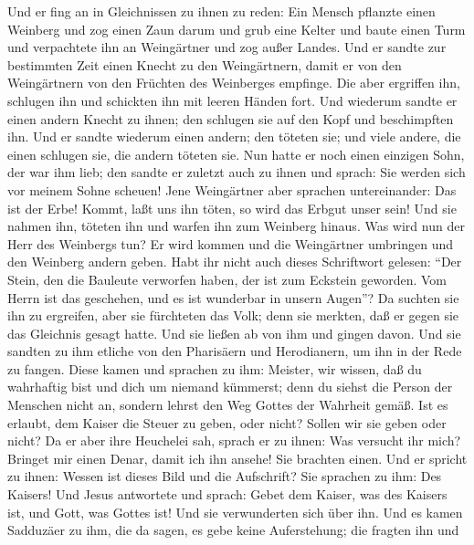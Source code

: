  Und er fing an in Gleichnissen zu ihnen zu reden: Ein
Mensch pflanzte einen Weinberg und zog einen Zaun darum und grub eine
Kelter und baute einen Turm und verpachtete ihn an Weingärtner und zog
außer Landes.  Und er sandte zur bestimmten Zeit einen
Knecht zu den Weingärtnern, damit er von den Weingärtnern von den
Früchten des Weinberges empfinge.  Die aber ergriffen ihn,
schlugen ihn und schickten ihn mit leeren Händen fort. 
Und wiederum sandte er einen andern Knecht zu ihnen; den schlugen sie
auf den Kopf und beschimpften ihn.  Und er sandte wiederum
einen andern; den töteten sie; und viele andere, die einen schlugen sie,
die andern töteten sie.  Nun hatte er noch einen einzigen
Sohn, der war ihm lieb; den sandte er zuletzt auch zu ihnen und sprach:
Sie werden sich vor meinem Sohne scheuen!  Jene
Weingärtner aber sprachen untereinander: Das ist der Erbe! Kommt, laßt
uns ihn töten, so wird das Erbgut unser sein!  Und sie
nahmen ihn, töteten ihn und warfen ihn zum Weinberg hinaus.
 Was wird nun der Herr des Weinbergs tun? Er wird kommen
und die Weingärtner umbringen und den Weinberg andern geben.
 Habt ihr nicht auch dieses Schriftwort gelesen: ``Der
Stein, den die Bauleute verworfen haben, der ist zum Eckstein geworden.
 Vom Herrn ist das geschehen, und es ist wunderbar in
unsern Augen''?  Da suchten sie ihn zu ergreifen, aber
sie fürchteten das Volk; denn sie merkten, daß er gegen sie das
Gleichnis gesagt hatte. Und sie ließen ab von ihm und gingen davon.
 Und sie sandten zu ihm etliche von den Pharisäern und
Herodianern, um ihn in der Rede zu fangen.  Diese kamen
und sprachen zu ihm: Meister, wir wissen, daß du wahrhaftig bist und
dich um niemand kümmerst; denn du siehst die Person der Menschen nicht
an, sondern lehrst den Weg Gottes der Wahrheit gemäß. Ist es erlaubt,
dem Kaiser die Steuer zu geben, oder nicht? Sollen wir sie geben oder
nicht?  Da er aber ihre Heuchelei sah, sprach er zu
ihnen: Was versucht ihr mich? Bringet mir einen Denar, damit ich ihn
ansehe!  Sie brachten einen. Und er spricht zu ihnen:
Wessen ist dieses Bild und die Aufschrift? Sie sprachen zu ihm: Des
Kaisers!  Und Jesus antwortete und sprach: Gebet dem
Kaiser, was des Kaisers ist, und Gott, was Gottes ist! Und sie
verwunderten sich über ihn.  Und es kamen Sadduzäer zu
ihm, die da sagen, es gebe keine Auferstehung; die fragten ihn und
